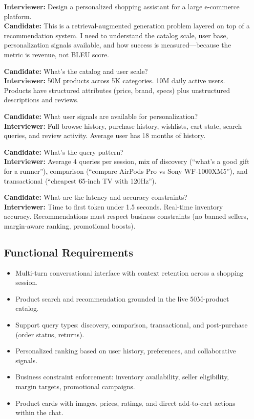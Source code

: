 \textbf{Interviewer:} Design a personalized shopping assistant for a large e-commerce platform.\\
\textbf{Candidate:} This is a retrieval-augmented generation problem layered on top of a recommendation system. I need to understand the catalog scale, user base, personalization signals available, and how success is measured---because the metric is revenue, not BLEU score.

\textbf{Candidate:} What's the catalog and user scale?\\
\textbf{Interviewer:} 50M products across 5K categories. 10M daily active users. Products have structured attributes (price, brand, specs) plus unstructured descriptions and reviews.

\textbf{Candidate:} What user signals are available for personalization?\\
\textbf{Interviewer:} Full browse history, purchase history, wishlists, cart state, search queries, and review activity. Average user has 18 months of history.

\textbf{Candidate:} What's the query pattern?\\
\textbf{Interviewer:} Average 4 queries per session, mix of discovery (``what's a good gift for a runner''), comparison (``compare AirPods Pro vs Sony WF-1000XM5''), and transactional (``cheapest 65-inch TV with 120Hz'').

\textbf{Candidate:} What are the latency and accuracy constraints?\\
\textbf{Interviewer:} Time to first token under 1.5 seconds. Real-time inventory accuracy. Recommendations must respect business constraints (no banned sellers, margin-aware ranking, promotional boosts).

\subsection*{Functional Requirements}

\begin{itemize}
  \item Multi-turn conversational interface with context retention across a shopping session.
  \item Product search and recommendation grounded in the live 50M-product catalog.
  \item Support query types: discovery, comparison, transactional, and post-purchase (order status, returns).
  \item Personalized ranking based on user history, preferences, and collaborative signals.
  \item Business constraint enforcement: inventory availability, seller eligibility, margin targets, promotional campaigns.
  \item Product cards with images, prices, ratings, and direct add-to-cart actions within the chat.
\end{itemize}

